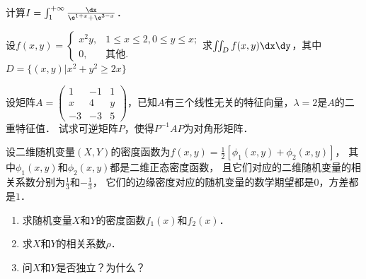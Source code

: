 \documentclass[plain,noanswer,medmath]{../../template/jnuexam}
\begin{document}

\begin{problem}
计算$I = \int_1^{+\infty} \frac{\dx}{\e^{1 + x} + \e^{3 - x}}$．
\end{problem}









\begin{problem}
设$f(x,y) = \begin{cases}
  x^2 y, & 1 \le x \le 2,0 \le y \le x; \\
      0, & \text{其他}.
\end{cases}$求$\iint_D f(x,y)\dx\dy$，其中$D = \{(x,y)|x^2 + y^2 \ge 2x\}$
\end{problem}









\begin{problem}
设矩阵$A = \begin{pmatrix}
   1 & -1 & 1 \\
   x &  4 & y \\
  -3 & -3 & 5
\end{pmatrix}$，已知$A$有三个线性无关的特征向量，$\lambda = 2$是$A$的二重特征值．
试求可逆矩阵$P$，使得$P^{-1} AP$为对角形矩阵．
\end{problem}



\begin{problem}
设二维随机变量$(X,Y)$的密度函数为$f(x,y) = \frac{1}{2}\left[\phi_1(x,y) + \phi_2(x,y) \right]$，
其中$\phi_1(x,y)$和$\phi_2(x,y)$都是二维正态密度函数，
且它们对应的二维随机变量的相关系数分别为$\frac{1}{3}$和$- \frac{1}{3}$，
它们的边缘密度对应的随机变量的数学期望都是$0$，方差都是$1$．
\begin{enumerate}
\item 求随机变量$X$和$Y$的密度函数$f_1(x)$和$f_2(x)$．
\item 求$X$和$Y$的相关系数$\rho$．
\item 问$X$和$Y$是否独立？为什么？
\end{enumerate}
\end{problem}



\end{document}
